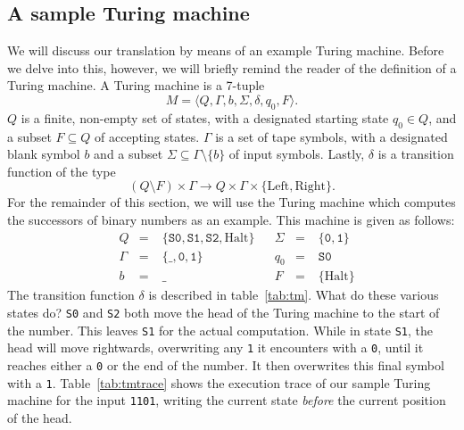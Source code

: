 \documentclass[11pt]{article}
\def\t#1{\texttt{#1}}
\begin{document}
\subsection{A sample Turing machine}
We will discuss our translation by means of an example Turing machine. Before we
delve into this, however, we will briefly remind the reader of the definition of
a Turing machine. A Turing machine is a 7-tuple
\[
  M = \langle Q, \Gamma, b, \Sigma, \delta, q_0, F \rangle.
\]
$Q$ is a finite, non-empty set of states, with a designated starting state $q_0
\in Q$, and a subset $F \subseteq Q$ of accepting states. $\Gamma$ is a set of
tape symbols, with a designated blank symbol $b$ and a subset $\Sigma \subseteq
\Gamma \setminus \{b\}$ of input symbols. Lastly, $\delta$ is a transition
function of the type
\[
  (Q \setminus F) \times \Gamma \to Q \times \Gamma \times \{\text{Left},\text{Right}\}.
\]
For the remainder of this section, we will use the Turing machine which computes
the successors of binary numbers as an example. This machine is given as follows:
\[\!
\begin{aligned}
  &Q&      \!\!\!\!=\;& \{\t{S0}, \t{S1}, \t{S2}, \text{Halt}\} &&\Sigma& \!\!\!\!=\;& \{\t{0}, \t{1}\} \\
  &\Gamma& \!\!\!\!=\;& \{\t{\_}, \t{0}, \t{1}\}                &&q_0&    \!\!\!\!=\;& \t{S0} \\
  &b&      \!\!\!\!=\;& \t{\_}                                  &&F&      \!\!\!\!=\;& \{\text{Halt}\}
\end{aligned}
\]
The transition function $\delta$ is described in table~\ref{tab:tm}.
What do these various states do? \t{S0} and \t{S2} both move the head of the
Turing machine to the start of the number. This leaves \t{S1} for the actual
computation. While in state \t{S1}, the head will move rightwards, overwriting
any \t{1} it encounters with a \t{0}, until it reaches either a \t{0} or the end
of the number. It then overwrites this final symbol with a \t{1}.
Table~\ref{tab:tmtrace} shows the execution trace of our sample Turing machine
for the input \t{1101}, writing the current state \emph{before} the current
position of the head.
\end{document}
